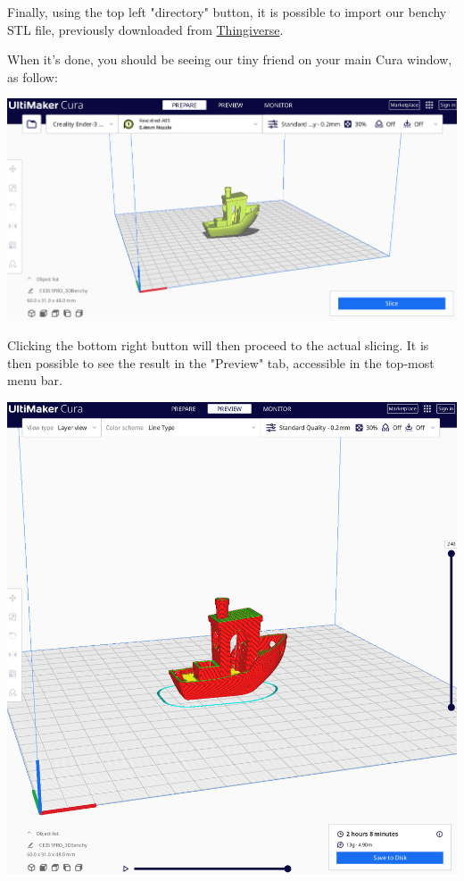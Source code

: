 \documentclass[a4paper,11pt]{article}
\begin{document}
Finally, using the top left "directory" button, it is possible to import our benchy STL file, previously
downloaded from \href{https://www.thingiverse.com/thing:763622/files}{Thingiverse}.

When it's done, you should be seeing our tiny friend on your main Cura window, as follow:

\begin{center}
\includegraphics[width=1\linewidth]{img/cura/9.png}
\end{center}

Clicking the bottom right button will then proceed to the actual slicing.
It is then possible to see the result in the "Preview" tab, accessible in the top-most menu bar.

\begin{center}
\includegraphics[width=.9\linewidth]{img/cura/10.png}
\end{center}
\end{document}
